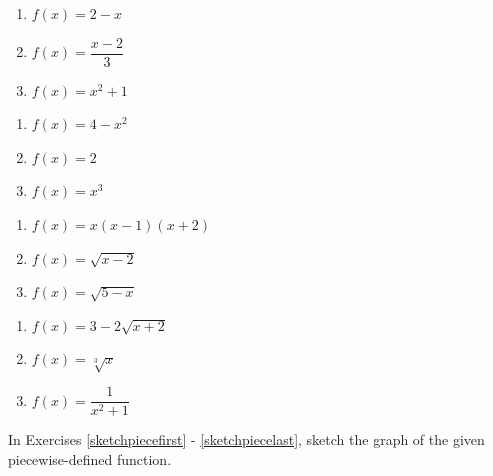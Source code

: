 \begin{multicols}{3}
\begin{enumerate}

\item $f(x) = 2-x$ \label{sketchgraphfirst}
\item $f(x) = \dfrac{x - 2}{3}$
\item $f(x) = x^2 + 1$

\setcounter{HW}{\value{enumi}}
\end{enumerate}
\end{multicols}

\begin{multicols}{3}
\begin{enumerate}
\setcounter{enumi}{\value{HW}}

\item $f(x) = 4-x^2$
\item $f(x) = 2$
\item $f(x) = x^3$

\setcounter{HW}{\value{enumi}}
\end{enumerate}
\end{multicols}

\begin{multicols}{3}
\begin{enumerate}
\setcounter{enumi}{\value{HW}}

\item $f(x) = x(x-1)(x+2)$
\item $f(x) = \sqrt{x-2}$
\item $f(x) = \sqrt{5 - x}$

\setcounter{HW}{\value{enumi}}
\end{enumerate}
\end{multicols}

\begin{multicols}{3}
\begin{enumerate}
\setcounter{enumi}{\value{HW}}

\item $f(x) = 3-2\sqrt{x+2}$
\item $f(x) = \sqrt[3]{x}$
\item $f(x) = \dfrac{1}{x^{2} + 1}$ \label{sketchgraphlast}

\setcounter{HW}{\value{enumi}}
\end{enumerate}
\end{multicols}

In Exercises \ref{sketchpiecefirst} - \ref{sketchpiecelast}, sketch the graph of the given piecewise-defined function.

